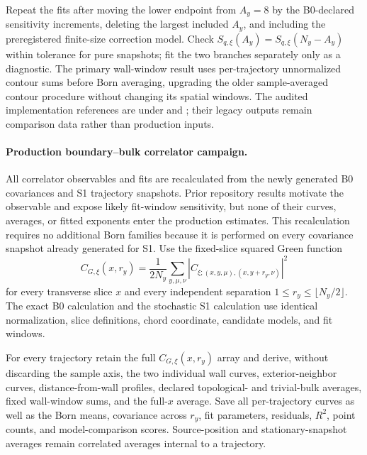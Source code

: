\documentclass[aps,prx,twocolumn,floatfix,nofootinbib,superscriptaddress,longbibliography]{revtex4-2}
\begin{document}
Repeat the fits after moving the lower endpoint from $A_y=8$ by the B0-declared
sensitivity increments, deleting the largest included $A_y$, and including the
preregistered finite-size correction model.  Check
$S_{q,\xi}(A_y)=S_{q,\xi}(N_y-A_y)$ within tolerance for pure snapshots; fit the two
branches separately only as a diagnostic.  The primary wall-window result uses
per-trajectory unnormalized contour sums before Born averaging, upgrading the older
sample-averaged contour procedure without changing its spatial windows.
The audited implementation references are under
 and
; their legacy outputs remain comparison data rather
than production inputs.

\paragraph*{Production boundary--bulk correlator campaign.}
All correlator observables and fits are recalculated from the newly generated B0
covariances and S1 trajectory snapshots.  Prior repository results motivate the observable
and expose likely fit-window sensitivity, but none of their curves, averages, or fitted
exponents enter the production estimates.  This recalculation requires no additional Born
families because it is performed on every covariance snapshot already generated for S1.
Use the fixed-slice squared Green function
\begin{equation}
 C_{G,\xi}(x,r_y)=\frac{1}{2N_y}\sum_{y,\mu,\nu}
 \left|C_{\xi;(x,y,\mu),(x,y+r_y,\nu)}\right|^2
 \label{eq:fixed-x-squared-correlator}
\end{equation}
for every transverse slice $x$ and every independent separation
$1\leq r_y\leq\lfloor N_y/2\rfloor$.  The exact B0 calculation and the stochastic S1
calculation use identical normalization, slice definitions, chord coordinate, candidate
models, and fit windows.

For every trajectory retain the full $C_{G,\xi}(x,r_y)$ array and derive, without
discarding the sample axis, the two individual wall curves, exterior-neighbor curves,
distance-from-wall profiles, declared topological- and trivial-bulk averages, fixed
wall-window sums, and the full-$x$ average.  Save all per-trajectory curves as well as the
Born means, covariance across $r_y$, fit parameters, residuals, $R^2$, point counts, and
model-comparison scores.  Source-position and stationary-snapshot averages remain
correlated averages internal to a trajectory.
\end{document}
